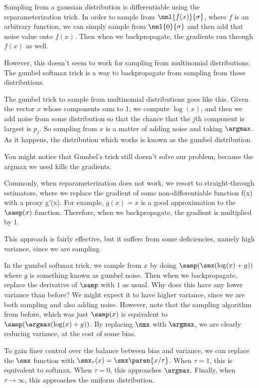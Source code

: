 \documentclass[12pt]{article}
\begin{document}
Sampling from a gaussian distribution is differentiable using the reparameterization trick. In order to sample from $\nml{f(x)}{\sigma}$, where $f$ is an arbitrary function, we can simply sample from $\nml{0}{\sigma}$ and then add that noise value onto $f(x)$. Then when we backpropagate, the gradients run through $f(x)$ as well.

However, this doesn't seem to work for sampling from multinomial distributions. The gumbel softmax trick is a way to backpropagate from sampling from these distributions. 

The gumbel trick to sample from multinomial distributions goes like this. Given the vector $x$ whose components sum to 1, we compute $\log(x)$, and then we add noise from some distribution so that the chance that the $j$th component is largest is $p_j$. So sampling from $x$ is a matter of adding noise and taking $\argmax$. As it happens, the distribution which works is known as the gumbel distribution.

You might notice that Gumbel's trick still doesn't solve our problem, because the argmax we used kills the gradients. 

Commonly, when reparameterization does not work, we resort to straight-through estimators, where we replace the gradient of some non-differentiable function f(x) with a proxy g'(x). For example, $g(x) = x$ is a good approximation to the $\samp(x)$ function. Therefore, when we backpropagate, the gradient is multiplied by 1.

This approach is fairly effective, but it suffers from some deficiencies, namely high variance, since we are sampling.

In the gumbel softmax trick, we sample from $x$ by doing $\samp(\smx(\log(x)+g))$ where $g$ is something known as gumbel noise. Then when we backpropagate, replace the derivative of $\samp$ with $1$ as usual. Why does this have any lower variance than before? We might expect it to have higher variance, since we are both sampling and also adding noise. However, note that the sampling algorithm from before, which was just $\samp(x)$ is equivalent to $\samp(\argmax(\log(x)+g))$. By replacing $\smx$ with $\argmax$, we are clearly reducing variance, at the cost of some bias.

To gain finer control over the balance between bias and variance, we can replace the $\smx$ function with $\smx_\tau(x) = \smx\paren{x/\tau}$. When $\tau = 1$, this is equivalent to softmax. When $\tau = 0$, this approaches $\argmax$. Finally, when $\tau \rightarrow \infty$, this approaches the uniform distribution.
\end{document}
